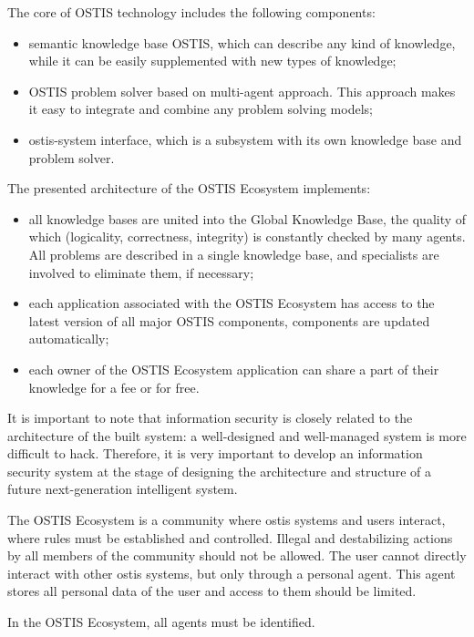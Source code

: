 \documentclass{article}
\begin{document}
\begin{multicols}{2}
\par 
The core of OSTIS technology includes the following
components:

\begin{itemize}
    \item semantic knowledge base OSTIS, which can describe
any kind of knowledge, while it can be easily
supplemented with new types of knowledge;
    \item OSTIS problem solver based on multi-agent approach. This approach makes it easy to integrate
and combine any problem solving models;
    \item ostis-system interface, which is a subsystem with its
own knowledge base and problem solver.
\end{itemize}
\par
The presented architecture of the OSTIS Ecosystem
implements:
    \begin{itemize}
        \item  all knowledge bases are united into the Global
Knowledge Base, the quality of which (logicality,
correctness, integrity) is constantly checked by many
agents. All problems are described in a single knowledge base, and specialists are involved to
eliminate them, if necessary;
    \item each application associated with the OSTIS Ecosystem has access to the latest version of all major
OSTIS components, components are updated automatically;
    \item each owner of the OSTIS Ecosystem application can
share a part of their knowledge for a fee or for free.
\end{itemize}
    \par
It is important to note that information security is
closely related to the architecture of the built system: a
well-designed and well-managed system is more difficult
to hack. Therefore, it is very important to develop an
information security system at the stage of designing
the architecture and structure of a future next-generation
intelligent system.
    \par 
The OSTIS Ecosystem is a community where ostis
systems and users interact, where rules must be established and controlled. Illegal and destabilizing actions by
all members of the community should not be allowed.
The user cannot directly interact with other ostis systems,
but only through a personal agent. This agent stores all
personal data of the user and access to them should be
limited.
    \par 
In the OSTIS Ecosystem, all agents must be identified.

\end{multicols}
\end{document}
